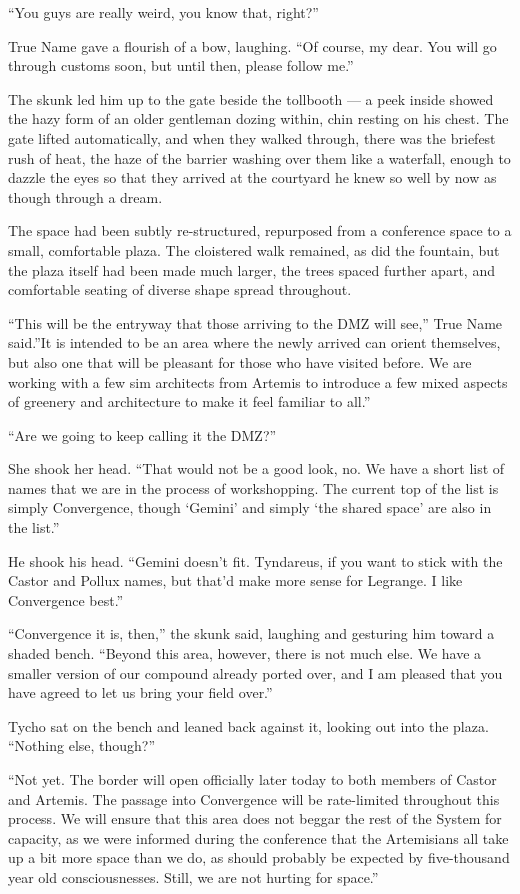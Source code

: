``You guys are really weird, you know that, right?''

True Name gave a flourish of a bow, laughing. ``Of course, my dear. You will go through customs soon, but until then, please follow me.''

The skunk led him up to the gate beside the tollbooth — a peek inside showed the hazy form of an older gentleman dozing within, chin resting on his chest. The gate lifted automatically, and when they walked through, there was the briefest rush of heat, the haze of the barrier washing over them like a waterfall, enough to dazzle the eyes so that they arrived at the courtyard he knew so well by now as though through a dream.

The space had been subtly re-structured, repurposed from a conference space to a small, comfortable plaza. The cloistered walk remained, as did the fountain, but the plaza itself had been made much larger, the trees spaced further apart, and comfortable seating of diverse shape spread throughout.

``This will be the entryway that those arriving to the DMZ will see,'' True Name said.''It is intended to be an area where the newly arrived can orient themselves, but also one that will be pleasant for those who have visited before. We are working with a few sim architects from Artemis to introduce a few mixed aspects of greenery and architecture to make it feel familiar to all.''

``Are we going to keep calling it the DMZ?''

She shook her head. ``That would not be a good look, no. We have a short list of names that we are in the process of workshopping. The current top of the list is simply Convergence, though `Gemini' and simply `the shared space' are also in the list.''

He shook his head. ``Gemini doesn't fit. Tyndareus, if you want to stick with the Castor and Pollux names, but that'd make more sense for Legrange. I like Convergence best.''

``Convergence it is, then,'' the skunk said, laughing and gesturing him toward a shaded bench. ``Beyond this area, however, there is not much else. We have a smaller version of our compound already ported over, and I am pleased that you have agreed to let us bring your field over.''

Tycho sat on the bench and leaned back against it, looking out into the plaza. ``Nothing else, though?''

``Not yet. The border will open officially later today to both members of Castor and Artemis. The passage into Convergence will be rate-limited throughout this process. We will ensure that this area does not beggar the rest of the System for capacity, as we were informed during the conference that the Artemisians all take up a bit more space than we do, as should probably be expected by five-thousand year old consciousnesses. Still, we are not hurting for space.''

